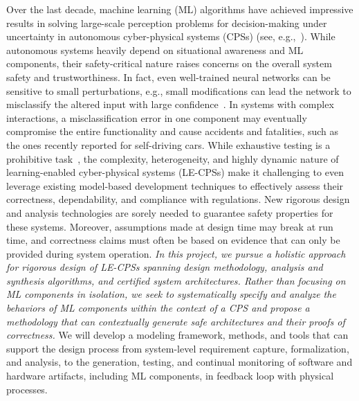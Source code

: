 \documentclass[10pt]{dod-blank}
\begin{document}
%
Over the last decade, machine learning (ML) algorithms have achieved impressive results in solving large-scale perception problems for decision-making under uncertainty in autonomous cyber-physical systems (CPSs) (see, e.g.,~\cite{Blum97,Jia14,Michalski13}).  While autonomous systems heavily depend on situational awareness and ML components, their safety-critical nature raises concerns on the overall system safety and trustworthiness. In fact, 
even well-trained neural networks can be sensitive to small perturbations, e.g., small modifications can lead the network to misclassify the altered input with large confidence~\cite{Szegedy2013}. In systems with complex interactions, a misclassification error in one component may eventually compromise the entire functionality and cause accidents and fatalities, such as the ones recently reported for self-driving cars.
% 
While exhaustive testing  is a prohibitive task~\cite{Kalra16}, the complexity, heterogeneity, and highly dynamic nature of learning-enabled cyber-physical systems (LE-CPSs)
make it challenging to even leverage existing model-based development techniques to effectively assess  their correctness, dependability, and compliance with regulations.  New rigorous design and analysis technologies are sorely needed to guarantee safety properties for these systems.   
Moreover, assumptions made at design time may break at run time, and correctness claims must often be  based on evidence that can only be provided during system operation.
%
\emph{In this project, we pursue a holistic approach for rigorous design of LE-CPSs spanning design methodology, analysis and synthesis algorithms, and certified system architectures.  
Rather than focusing on ML components in isolation, we seek to systematically specify and analyze the behaviors of ML components within the context of a CPS and propose a methodology that can contextually generate safe architectures and their proofs of correctness.} We will develop a modeling framework, methods, and tools that can support the design process from system-level requirement capture, formalization, and analysis, to the generation, testing, and continual monitoring of software and hardware artifacts, including ML components, in feedback loop with physical processes.
\end{document}
